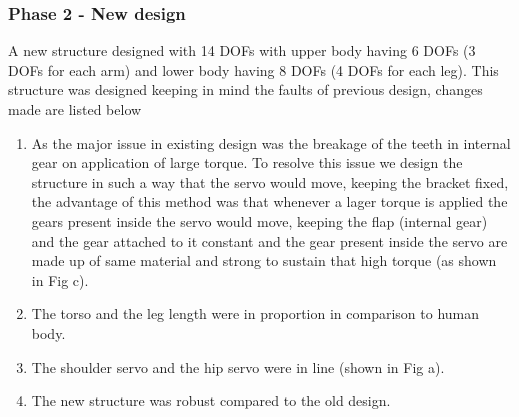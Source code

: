 \documentclass[12pt]{article}
\begin{document}
\subsubsection{Phase 2 - New design}
A new structure designed with 14 DOFs with upper body
having 6 DOFs (3 DOFs for each arm) and lower body having 8 DOFs (4 DOFs for
each leg). This structure was designed keeping in mind the faults of previous design,
changes made are listed below
\begin{enumerate}
	\item As the major issue in existing design was the breakage of the teeth in internal
	gear on application of large torque. To resolve this issue we design the structure
	in such a way that the servo would move, keeping the bracket fixed, the
	advantage of this method was that whenever a lager torque is applied the gears
	present inside the servo would move, keeping the flap (internal gear) and the gear
	attached to it constant and the gear present inside the servo are made up of same
	material and strong to sustain that high torque (as shown in Fig c).
	\item The torso and the leg length were in proportion in comparison to human body.
	\item The shoulder servo and the hip servo were in line (shown in Fig a).
	\item The new structure was robust compared to the old design.
\end{enumerate}
\end{document}
